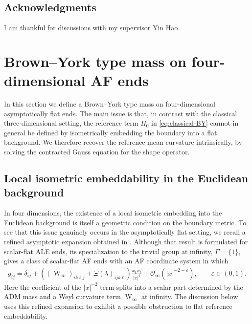 \documentclass[10pt,a4paper]{amsart}
\newcommand{\Weyl}{\operatorname{W}}
\begin{document}
	
	
	
	
	\subsection{Acknowledgments}
	
	I am thankful for discussions with my supervisor Yin Hao.
	
	\section{Brown--York type mass on four-dimensional AF ends}\label{sec:BY-mass}
	
	In this section we define a Brown--York type mass on four-dimensional
	asymptotically flat ends.  The main issue is that, in contrast with the
	classical three-dimensional setting, the reference term $H_0$ in \eqref{eq:classical-BY} cannot in general be
	defined by isometrically embedding the boundary into a flat background.
	We therefore recover the reference mean curvature intrinsically, by solving
	the contracted Gauss equation for the shape operator.
	
	\subsection{Local isometric embeddability in the Euclidean background}
	\label{subsec:local-embed}
	
	In four dimensions, the existence of a local isometric embedding into the Euclidean background is itself a geometric condition on the boundary metric. To see that this issue genuinely occurs in the asymptotically flat setting,
	we recall a refined asymptotic expansion obtained in \cite{YouALE26}.
	Although that result is formulated for scalar-flat ALE ends, its specialization
	to the trivial group at infinity, $\Gamma=\{1\}$, gives a class of
	scalar-flat AF ends with an AF coordinate system in which
	\begin{align}\label{eq:metric-expansion-after}
		g_{ij}
		=
		\delta_{ij}
		+
		\left(
		\left(\Weyl_\infty\right)_{ik\ell j}
		+
		\Xi(\lambda)_{ijk\ell}
		\right)
		\frac{x_kx_\ell}{|x|^4}
		+
		\mathcal O_\infty(|x|^{-2-\varepsilon}),
		\qquad
		\varepsilon\in(0,1).
	\end{align}
	Here the coefficient of the $|x|^{-2}$ term splits into a scalar part determined by the ADM mass
	and a Weyl curvature term $\Weyl_\infty$ at infinity.  The discussion below uses this refined expansion to exhibit a possible obstruction to flat reference
	embeddability.
	
\end{document}
